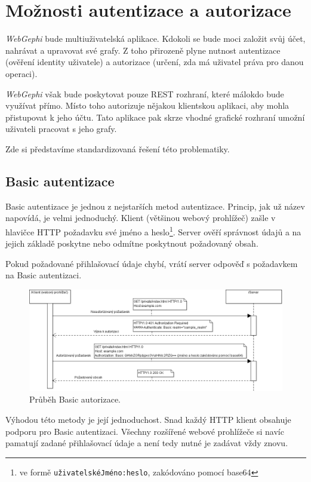 \documentclass[thesis=M,czech]{FITthesis}[2014/05/6]
\begin{document}
\section{Možnosti autentizace a autorizace}
\textit{WebGephi} bude multiuživatelská aplikace. Kdokoli se bude moci založit svůj účet, nahrávat a upravovat své grafy.
Z toho přirozeně plyne nutnost autentizace (ověření identity uživatele) a autorizace (určení, zda má uživatel práva pro danou operaci).

\textit{WebGephi} však bude poskytovat pouze REST rozhraní, které málokdo bude využívat přímo. Místo toho autorizuje nějakou klientskou aplikaci, aby
mohla přistupovat k jeho účtu. Tato aplikace pak skrze vhodné grafické rozhraní umožní uživateli pracovat s jeho grafy.

Zde si představíme standardizovaná řešení této problematiky.

\subsection{Basic autentizace\cite{wiki:basic}}
Basic autentizace je jednou z nejstarších metod autentizace. Princip, jak už název napovídá, je velmi jednoduchý. Klient (většinou webový prohlížeč) zašle
v hlavičce HTTP požadavku své jméno a heslo\footnote{ve formě \texttt{uživatelskéJméno:heslo}, zakódováno pomocí base64}. Server ověří správnost údajů a na jejich základě poskytne nebo
odmítne poskytnout požadovaný obsah.

Pokud požadované přihlašovací údaje chybí, vrátí server odpověď s požadavkem na Basic autentizaci.

\begin{figure}\centering
 	\includegraphics[width=1\textwidth]{images/diagram/auth_basic}
 	\caption[Průběh Basic autorizace]{Průběh Basic autorizace.}\label{fig:auth-basic}
\end{figure}

Výhodou této metody je její jednoduchost. Snad každý HTTP klient obsahuje podporu pro Basic autentizaci. Všechny rozšířené webové prohlížeče si navíc pamatují 
zadané přihlašovací údaje a není tedy nutné je zadávat vždy znovu.
\end{document}
